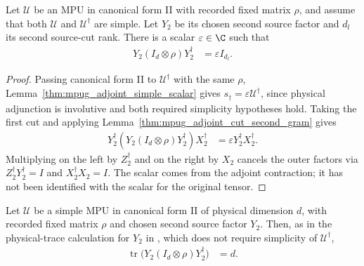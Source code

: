 \begin{lemma}
    \label{thm:mpug_source_y_two_scalar_gram}
    \leanok
    Let $\mathcal U$ be an MPU in canonical form II with recorded fixed
    matrix $\rho$, and assume that both $\mathcal U$ and
    $\mathcal U^\dagger$ are simple. Let $Y_2$ be its chosen second
    source factor and $d_l$ its second source-cut rank. There is a scalar
    $\varepsilon\in\C$ such that
    \begin{align}
        Y_2(I_d\otimes\rho)Y_2^\dagger & =\varepsilon I_{d_l}.
    \end{align}
\end{lemma}

\begin{proof}\leanok
    Passing canonical form II to $\mathcal U^\dagger$ with the same
    $\rho$, Lemma~\ref{thm:mpug_adjoint_simple_scalar} gives
    $s_\dagger=\varepsilon\mathcal U^\dagger$, since physical adjunction
    is involutive and both required simplicity hypotheses hold.
    Taking the first cut and applying
    Lemma~\ref{thm:mpug_adjoint_cut_second_gram} gives
    \begin{align}
        Y_2^\dagger(Y_2(I_d\otimes\rho)Y_2^\dagger)X_2^\dagger
         & =\varepsilon Y_2^\dagger X_2^\dagger.
    \end{align}
    Multiplying on the left by $Z_2^\dagger$ and on the right by $X_2$
    cancels the outer factors via $Z_2^\dagger Y_2^\dagger=I$ and
    $X_2^\dagger X_2=I$. The scalar comes from the adjoint contraction; it
    has not been identified with the scalar for the original tensor.
\end{proof}

\begin{lemma}
    \label{thm:mpug_source_y_two_gram_trace}
    \leanok
    Let $\mathcal U$ be a simple MPU in canonical form II of physical
    dimension $d$, with recorded fixed matrix $\rho$ and chosen second
    source factor $Y_2$. Then, as in the physical-trace calculation for
    $Y_2$ in \cite[line~1398]{FrancoRubio2025MPUGauging}, which does not
    require simplicity of $\mathcal U^\dagger$,
    \begin{align}
        \operatorname{tr}\bigl(Y_2(I_d\otimes\rho)Y_2^\dagger\bigr) & =d.
    \end{align}
\end{lemma}

